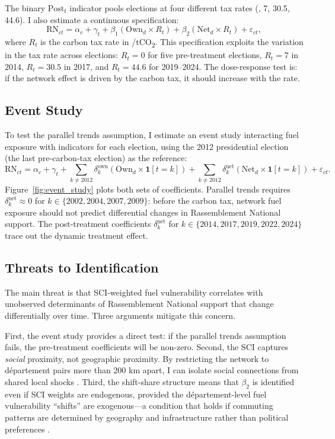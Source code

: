 \documentclass[12pt]{article}
\providecommand{\euro}{\texteuro}
\newcommand{\rn}{Rassemblement National}
\newcommand{\dept}{d\'{e}partement}
\begin{document}
The binary $\text{Post}_t$ indicator pools elections at four different tax rates (\euro 0, 7, 30.5, 44.6). I also estimate a continuous specification:
\begin{equation}
\text{RN}_{ct} = \alpha_c + \gamma_t + \beta_1 (\text{Own}_d \times R_t) + \beta_2 (\text{Net}_d \times R_t) + \varepsilon_{ct},
\label{eq:continuous}
\end{equation}
where $R_t$ is the carbon tax rate in \euro/tCO\textsubscript{2}. This specification exploits the variation in the tax rate across elections: $R_t = 0$ for five pre-treatment elections, $R_t = 7$ in 2014, $R_t = 30.5$ in 2017, and $R_t = 44.6$ for 2019--2024. The dose-response test is: if the network effect is driven by the carbon tax, it should increase with the rate.

\subsection{Event Study}

To test the parallel trends assumption, I estimate an event study interacting fuel exposure with indicators for each election, using the 2012 presidential election (the last pre-carbon-tax election) as the reference:
\begin{equation}
\text{RN}_{ct} = \alpha_c + \gamma_t + \sum_{k \neq 2012} \delta^{\text{own}}_k (\text{Own}_d \times \mathbf{1}[t = k]) + \sum_{k \neq 2012} \delta^{\text{net}}_k (\text{Net}_d \times \mathbf{1}[t = k]) + \varepsilon_{ct}.
\label{eq:event_study}
\end{equation}
Figure~\ref{fig:event_study} plots both sets of coefficients. Parallel trends requires $\delta^{\text{net}}_k \approx 0$ for $k \in \{2002, 2004, 2007, 2009\}$: before the carbon tax, network fuel exposure should not predict differential changes in \rn{} support. The post-treatment coefficients $\delta^{\text{net}}_k$ for $k \in \{2014, 2017, 2019, 2022, 2024\}$ trace out the dynamic treatment effect.

\subsection{Threats to Identification}

The main threat is that SCI-weighted fuel vulnerability correlates with unobserved determinants of \rn{} support that change differentially over time. Three arguments mitigate this concern.

First, the event study provides a direct test: if the parallel trends assumption fails, the pre-treatment coefficients will be non-zero. Second, the SCI captures \emph{social} proximity, not geographic proximity. By restricting the network to \dept{} pairs more than 200 km apart, I can isolate social connections from shared local shocks \citep{bailey2020social}. Third, the shift-share structure means that $\beta_2$ is identified even if SCI weights are endogenous, provided the \dept{}-level fuel vulnerability ``shifts'' are exogenous---a condition that holds if commuting patterns are determined by geography and infrastructure rather than political preferences \citep{borusyak2022quasi}.
\end{document}
